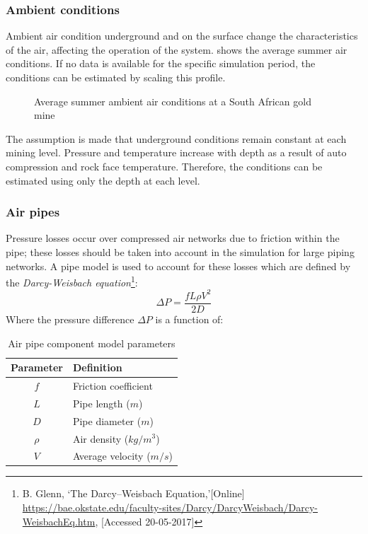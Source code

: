		\subsubsection{Ambient conditions}
		Ambient air condition underground and on the surface change the characteristics of the air, affecting the operation of the system.  shows the average summer air conditions. If no data is available for the specific simulation period, the conditions can be estimated by scaling this profile.
		\begin{figure}[h!]
			\centering
			\fbox{}
			\caption{Average summer ambient air conditions at a South African gold mine}
			\label{fig: Ambient}
		\end{figure}
		\par
		The assumption is made that underground conditions remain constant at each mining level. Pressure and temperature increase with depth as a result of auto compression and rock face temperature. Therefore, the conditions can be estimated using only the depth at each level.
		\subsubsection{Air pipes}
		Pressure losses occur over compressed air networks due to friction within the pipe; these losses should be taken into account in the simulation for large piping networks. A pipe model is used to account for these losses which are defined by the \textit{Darcy-Weisbach equation}\footnote{ B. Glenn, \enquote*{The Darcy–Weisbach Equation,}[Online] \url{https://bae.okstate.edu/faculty-sites/Darcy/DarcyWeisbach/Darcy-WeisbachEq.htm}, [Accessed 20-05-2017]}:
		$$\Delta P = \frac{f L \rho V^2}{2 D}$$
		Where the pressure difference $\Delta P $ is a function of:
		\begin{table}[h!]
			\centering
			\begin{tabular}{cl}
				\hline
				Parameter & Definition\\
				\hline
				$f$ & Friction coefficient \\
				$L$ & Pipe length ($m$) \\
				$D$ & Pipe diameter ($m$) \\
				$\rho$ & Air density ($kg/m^3$)\\	
				$V$ & Average velocity ($m/s$) \\	
				\hline
			\end{tabular} 
			\caption{Air pipe component model parameters}
			\label{table: Darcy-Weisbach}
		\end{table}
		
